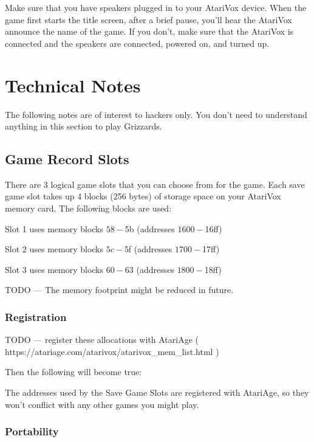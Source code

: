 \documentclass[10pt,twoside,openright]{memoir}
\begin{document}
Make sure that you have speakers plugged in to your AtariVox
device. When the game first starts the title screen, after a brief
pause, you'll hear the AtariVox announce the name of the game. If you
don't, make sure that the AtariVox is connected and the speakers are
connected, powered on, and turned up.

\chapter{Technical Notes}

The following notes are of interest to hackers only. You don't need to
understand anything in this section to play Grizzards.

\section{Game Record Slots}

There are 3 logical game slots that you can choose from for the
game. Each save game slot takes up 4 blocks (256 bytes) of storage
space on your AtariVox memory card. The following blocks are used:

\begin{enumeration}
\item Slot 1 uses memory blocks $58-$5b (addresses $1600-$16ff)
\item Slot 2 uses memory blocks $5c-$5f (addresses $1700-$17ff)
\item Slot 3 uses memory blocks $60-$63 (addresses $1800-$18ff)
\end{enumeration}

TODO --- The memory footprint might be reduced in future.

\subsection{Registration}

TODO --- register these allocations with AtariAge (
https://atariage.com/atarivox/atarivox\_mem\_list.html )

Then the following will become true:

The addresses used by the Save Game Slots are registered with
AtariAge, so they won't conflict with any other games you might play.

\subsection{Portability}
\end{document}
